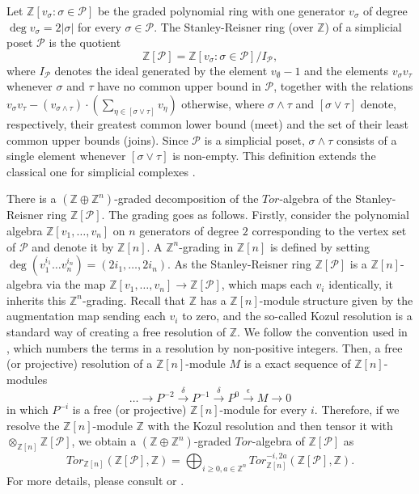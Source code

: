 \documentclass[a4paper,11pt]{article}
\theoremstyle{definition}
\newcommand{\Z}{\mathbb{Z}}
\newcommand{\PP}{\mathcal{P}}
\begin{document}
Let $\Z[v_\sigma: \sigma \in \PP]$ be the graded polynomial ring with one generator $v_\sigma$ of degree $\deg v_\sigma = 2 |\sigma|$ for every $\sigma \in \PP$. The Stanley-Reisner ring (over $\Z$) of a simplicial poset $\PP$ is the quotient 
\[
\Z[\PP] = \Z[v_\sigma: \sigma \in \PP] / I_\PP,
\]
where $I_\PP$ denotes the ideal generated by the element $v_{\emptyset} - 1$ and the elements $v_\sigma v_\tau$ whenever $\sigma$ and $\tau$ have no common upper bound in $\PP$, together with the relations $v_\sigma v_\tau - (v_{\sigma \wedge \tau}) \cdot \left(\sum_{\eta \in [\sigma \vee \tau]} v_\eta\right)$ otherwise, where $\sigma \wedge \tau$ and $[\sigma \vee \tau]$ denote, respectively, their greatest common lower bound (meet) and the set of their least common upper bounds (joins). Since $\PP$ is a simplicial poset, $\sigma \wedge \tau$ consists of a single element whenever $[\sigma \vee \tau]$ is non-empty. This definition extends the classical one for simplicial complexes \cite[Definition~3.3]{STANLEY-fhvectors}.

There is a $(\Z \oplus \Z^n)$-graded decomposition of the $Tor$-algebra of the Stanley-Reisner ring $\Z[\PP]$. The grading goes as follows. Firstly, consider the polynomial algebra $\Z[v_1, \ldots, v_n]$ on $n$ generators of degree $2$ corresponding to the vertex set of $\PP$ and denote it by $\Z[n]$. A $\Z^n$-grading in $\Z[n]$ is defined by setting $\deg(v_1^{i_1}\ldots v_n^{i_n}) = (2i_1,\ldots, 2i_n)$. As the Stanley-Reisner ring $\Z[\PP]$ is a $\Z[n]$-algebra via the map $\Z[v_1,\ldots,v_n] \to \Z[\PP]$, which maps each $v_i$ identically, it inherits this $\Z^n$-grading. Recall that $\Z$ has a $\Z[n]$-module structure given by the augmentation map sending each $v_i$ to zero, and the so-called Kozul resolution is a standard way of creating a free resolution of $\Z$. We follow the convention used in \cite{lue-panov}, which numbers the terms in a resolution by non-positive integers. Then, a free (or projective) resolution of a $\Z[n]$-module $M$ is a exact sequence of $\Z[n]$-modules  
\[
\ldots \to P^{-2} \xrightarrow{\delta} P^{-1} \xrightarrow{\delta} P^0 \xrightarrow{\epsilon} M \to 0
\] 
in which $P^{-i}$ is a free (or projective) $\Z[n]$-module for every $i$. Therefore, if we resolve the $\Z[n]$-module $\Z$ with the Kozul resolution and then tensor it with $\otimes_{\Z[n]} \Z[\PP]$, we obtain a $(\Z \oplus \Z^n)$-graded $Tor$-algebra of $\Z[\PP]$ as \[Tor_{\Z[n]}(\Z[\PP],\Z) = \bigoplus_{i \geq 0, a \in \Z^n}Tor^{-i,2a}_{\Z[n]}(\Z[\PP],\Z).\]
For more details, please consult \cite{lue-panov} or \cite[Chapter~4.10,Appendix~A.2]{buchstaber2014toric}. 
\end{document}

